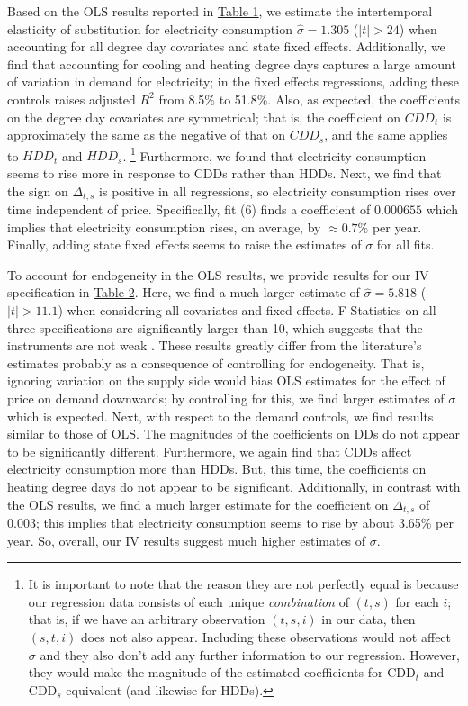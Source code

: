 \documentclass[11pt,a4paper]{extarticle}
\begin{document}
Based on the OLS results reported in \hyperref[table:1]{Table 1}, we estimate the intertemporal elasticity of substitution for electricity consumption $\hat{\sigma}  = 1.305$ ($|t| > 24$) when accounting for all degree day covariates and state fixed effects. Additionally, we find that accounting for cooling and heating degree days captures a large amount of variation in demand for electricity; in the fixed effects regressions, adding these controls raises adjusted $R^2$ from 8.5\% to 51.8\%. Also, as expected, the coefficients on the degree day covariates are symmetrical; that is, the coefficient on $CDD_{t}$ is approximately the same as the negative of that on $CDD_{s}$, and the same applies to $HDD_{t}$ and $HDD_{s}$. \footnote{It is important to note that the reason they are not perfectly equal is because our regression data consists of each unique \textit{combination} of $(t,s)$ for each $i$; that is, if we have an arbitrary observation $(t,s,i)$ in our data, then $(s,t,i)$ does not also appear. Including these observations would not affect $\sigma$ and they also don't add any further information to our regression. However, they would make the magnitude of the estimated coefficients for  CDD$_t$ and CDD$_s$ equivalent (and likewise for HDDs). }  Furthermore, we found that electricity consumption seems to rise more in response to CDDs rather than HDDs.  Next, we find that the sign on $\Delta_{t,s}$ is positive in all regressions, so electricity consumption rises over time independent of price. Specifically, fit (6) finds a coefficient of $0.000655$ which implies that electricity consumption rises, on average, by $\approx 0.7\%$ per year. Finally, adding state fixed effects seems to raise the estimates of $\sigma$ for all fits. 

To account for endogeneity in the OLS results, we provide results for our IV specification in \hyperref[table:2]{Table 2}. Here, we find a much larger estimate of $\hat{\sigma}  = 5.818$ ($|t| > 11.1$) when considering all covariates and fixed effects. F-Statistics on all three specifications are significantly larger than 10, which suggests that the instruments are not weak \citep{SS1997}. These results greatly differ from the literature's estimates probably as a consequence of controlling for endogeneity. That is, ignoring variation on the supply side would bias OLS estimates for the effect of price on demand downwards; by controlling for this, we find larger estimates of $\sigma$ which is expected. Next, with respect to the demand controls, we find results similar to those of OLS. The magnitudes of the coefficients on DDs do not appear to be significantly different. Furthermore, we again find that CDDs affect electricity consumption more than HDDs. But, this time, the coefficients on heating degree days do not appear to be significant. Additionally, in contrast with the OLS results, we find a much larger estimate for the coefficient on $\Delta_{t,s}$ of $0.003$; this implies that electricity consumption seems to rise by about 3.65\% per year. So, overall, our IV results suggest much higher estimates of $\sigma$. 
\end{document}
